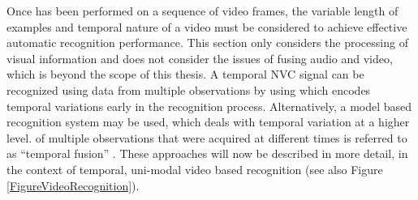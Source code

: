 Once \featureGeneration has been performed on a sequence of video frames, the variable length of examples and temporal nature of a video must be considered to achieve effective automatic recognition performance. This section only considers the processing of visual information and does not consider the issues of fusing audio and video, which is beyond the scope of this thesis. A temporal \ac{NVC} signal can be recognized using data from multiple observations by using \dataFusion which encodes temporal variations early in the recognition process. Alternatively, a model based recognition system may be used, which deals with temporal variation at a higher level.
\DataFusion of multiple observations that were acquired at different times is referred to as ``temporal fusion'' \cite{Varshney1997, Ko2008}. 
These \dataFusion approaches will now be described in more detail, in the context of temporal, uni-modal video based recognition (see also Figure \ref{FigureVideoRecognition}).

